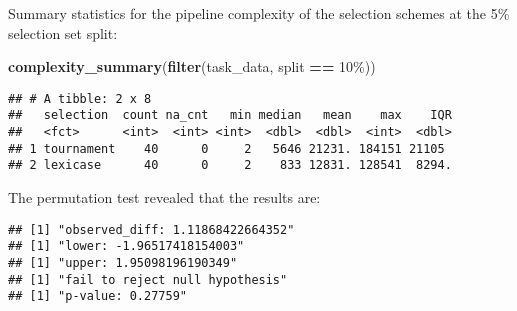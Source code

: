 \documentclass[
]{book}
\newenvironment{Shaded}{\begin{snugshade}}{\end{snugshade}}
\newcommand{\AttributeTok}[1]{\textcolor[rgb]{0.13,0.29,0.53}{#1}}
\newcommand{\DecValTok}[1]{\textcolor[rgb]{0.00,0.00,0.81}{#1}}
\newcommand{\FunctionTok}[1]{\textcolor[rgb]{0.13,0.29,0.53}{\textbf{#1}}}
\newcommand{\NormalTok}[1]{#1}
\newcommand{\OtherTok}[1]{\textcolor[rgb]{0.56,0.35,0.01}{#1}}
\newcommand{\SpecialCharTok}[1]{\textcolor[rgb]{0.81,0.36,0.00}{\textbf{#1}}}
\newcommand{\StringTok}[1]{\textcolor[rgb]{0.31,0.60,0.02}{#1}}
\begin{document}
Summary statistics for the pipeline complexity of the selection schemes at the 5\% selection set split:

\begin{Shaded}
\begin{Highlighting}[]
\FunctionTok{complexity\_summary}\NormalTok{(}\FunctionTok{filter}\NormalTok{(task\_data, split }\SpecialCharTok{==} \StringTok{\textquotesingle{}10\%\textquotesingle{}}\NormalTok{))}
\end{Highlighting}
\end{Shaded}

\begin{verbatim}
## # A tibble: 2 x 8
##   selection  count na_cnt   min median   mean    max    IQR
##   <fct>      <int>  <int> <int>  <dbl>  <dbl>  <int>  <dbl>
## 1 tournament    40      0     2   5646 21231. 184151 21105 
## 2 lexicase      40      0     2    833 12831. 128541  8294.
\end{verbatim}

The permutation test revealed that the results are:

\begin{Shaded}
\end{Shaded}

\begin{verbatim}
## [1] "observed_diff: 1.11868422664352"
## [1] "lower: -1.96517418154003"
## [1] "upper: 1.95098196190349"
## [1] "fail to reject null hypothesis"
## [1] "p-value: 0.27759"
\end{verbatim}
\end{document}
